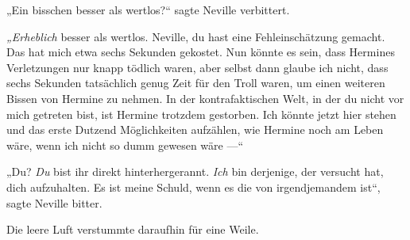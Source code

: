 „Ein bisschen besser als wertlos?“ sagte Neville verbittert.

\emph{„Erheblich} besser als wertlos. Neville, du hast eine Fehleinschätzung gemacht. Das hat mich etwa sechs Sekunden gekostet. Nun könnte es sein, dass Hermines Verletzungen nur knapp tödlich waren, aber selbst dann glaube ich nicht, dass sechs Sekunden tatsächlich genug Zeit für den Troll waren, um einen weiteren Bissen von Hermine zu nehmen. In der kontrafaktischen Welt, in der du nicht vor mich getreten bist, ist Hermine trotzdem gestorben. Ich könnte jetzt hier stehen und das erste Dutzend Möglichkeiten aufzählen, wie Hermine noch am Leben wäre, wenn ich nicht so dumm gewesen wäre —“

„Du? \emph{Du} bist ihr direkt hinterhergerannt. \emph{Ich} bin derjenige, der versucht hat, dich aufzuhalten. Es ist meine Schuld, wenn es die von irgendjemandem ist“, sagte Neville bitter.

Die leere Luft verstummte daraufhin für eine Weile.

